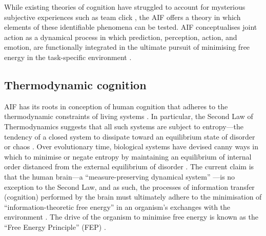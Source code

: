 \begin{CJK}{UTF8}{gbsn}
While existing theories of cognition have struggled to account for mysterious subjective experiences such as team click \citep{Dietrich2004,Slingerland2014}, the AIF offers a theory in which elements of these identifiable phenomena can be tested.  AIF conceptualises joint action as a dynamical process in which prediction, perception, action, and emotion, are functionally integrated in the ultimate pursuit of minimising free energy in the task-specific environment \citep{Clark2015}.


\subsection{Thermodynamic cognition\label{sect:thermoCog}}
AIF has its roots in conception of human cognition that adheres to the thermodynamic constraints of living systems \citep{Yufik2017}.  In particular, the Second Law of Thermodynamics suggests that all such systems are subject to entropy---the tendency of a closed system to dissipate toward an equilibrium state of disorder or chaos \citep{Wolfram2002}.  Over evolutionary time, biological systems have devised canny ways in which to minimise or negate entropy by maintaining an equilibrium of internal order distanced from the external equilibrium of disorder \citep{Schrodinger1944}.  The current claim is that the human brain---a ``measure-preserving dynamical system'' \citep[c.f.][]{Friston2013}---is no exception to the Second Law, and as such, the processes of information transfer (cognition) performed by the brain must ultimately adhere to the minimisation of ``information-theoretic free energy'' in an organism's exchanges with the environment \citep[entropy can be understood as the average quantity of free energy to which an organism is subject][]{Yufik2002,Yufik2013,Friston2010,Sengupta2013,Sengupta2016,Sengupta2017}. The drive of the organism to minimise free energy is known as the ``Free Energy Principle'' (FEP) \citep[see][]{Friston2010}.


\end{CJK}
